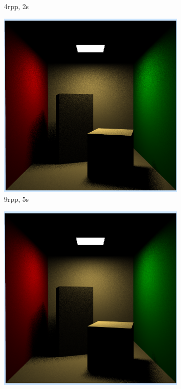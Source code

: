 \begin{figure}[h]
\begin{subfigure}[b]{0.4\textwidth}
		\caption{4rpp, 2s}
	\end{subfigure}
	\begin{subfigure}[b]{0.4\textwidth}
		\includegraphics[width=\textwidth]{week4/arealight_9rpp_5s.png}
		\caption{9rpp, 5s}
	\end{subfigure}
	\begin{subfigure}[b]{0.4\textwidth}
		\includegraphics[width=\textwidth]{week4/arealight_16rpp_10s.png}

\end{subfigure}
\end{figure}
